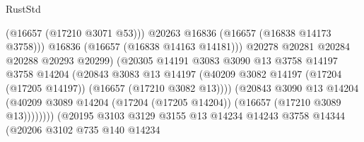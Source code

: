 \begin{lexlean}{RustStd}
\begin{coremodule}
                                              (@16657 (@17210 @3071 @53)))
                                            @20263
                                            @16836
                                            (@16657 (@16838 @14173 @3758)))
                                          @16836
                                          (@16657 (@16838 @14163 @14181)))
                                        @20278
                                        @20281
                                        @20284
                                        @20288
                                        @20293
                                        @20299)
                                      (@20305
                                        @14191
                                        @3083
                                        @3090
                                        @13
                                        @3758
                                        @14197
                                        @3758
                                        @14204
                                        (@20843
                                          @3083
                                          @13
                                          @14197
                                          (@40209
                                            @3082
                                            @14197
                                            (@17204 (@17205 @14197))
                                            (@16657 (@17210 @3082 @13))))
                                        (@20843
                                          @3090
                                          @13
                                          @14204
                                          (@40209
                                            @3089
                                            @14204
                                            (@17204 (@17205 @14204))
                                            (@16657 (@17210 @3089 @13))))))))
                                (@20195
                                  @3103
                                  @3129
                                  @3155
                                  @13
                                  @14234
                                  @14243
                                  @3758
                                  @14344
                                  (@20206
                                    @3102
                                    @735
                                    @140
                                    @14234

\end{coremodule}
\end{lexlean}
